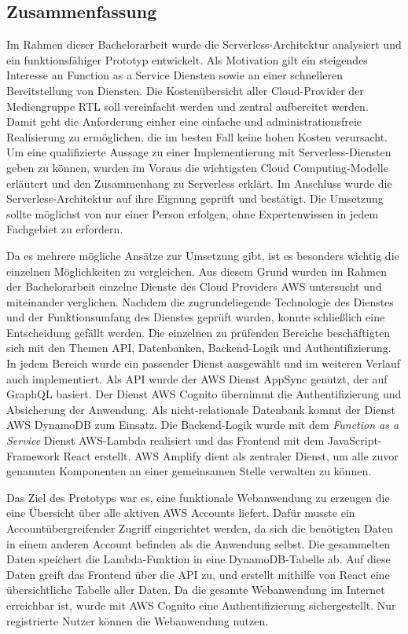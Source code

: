 \subsection{Zusammenfassung}
Im Rahmen dieser Bachelorarbeit wurde die Serverless-Architektur analysiert und ein funktionsfähiger Prototyp entwickelt.
Als Motivation gilt ein steigendes Interesse an Function as a Service Diensten sowie an einer schnelleren Bereitstellung von Diensten.
Die Kostenübersicht aller Cloud-Provider der Mediengruppe RTL soll vereinfacht werden und zentral aufbereitet werden.
Damit geht die Anforderung einher eine einfache und administrationsfreie Realisierung zu ermöglichen, die im besten Fall keine hohen Kosten verursacht.
Um eine qualifizierte Aussage zu einer Implementierung mit Serverless-Diensten geben zu können, wurden im Voraus die wichtigsten Cloud Computing-Modelle erläutert und den Zusammenhang zu Serverless erklärt.
Im Anschluss wurde die Serverless-Architektur auf ihre Eignung geprüft und bestätigt.
Die Umsetzung sollte möglichst von nur einer Person erfolgen, ohne Expertenwissen in jedem Fachgebiet zu erfordern.

Da es mehrere mögliche Ansätze zur Umsetzung gibt, ist es besonders wichtig die einzelnen Möglichkeiten zu vergleichen.
Aus diesem Grund wurden im Rahmen der Bachelorarbeit einzelne Dienste des Cloud Providers AWS untersucht und miteinander verglichen.
Nachdem die zugrundeliegende Technologie des Dienstes und der Funktionsumfang des Dienstes geprüft wurden, konnte schließlich eine Entscheidung gefällt werden.
Die einzelnen zu prüfenden Bereiche beschäftigten sich mit den Themen API, Datenbanken, Backend-Logik und Authentifizierung.
In jedem Bereich wurde ein passender Dienst ausgewählt und im weiteren Verlauf auch implementiert.
Als API wurde der AWS Dienst AppSync genutzt, der auf GraphQL basiert.
Der Dienst AWS Cognito übernimmt die Authentifizierung und Absicherung der Anwendung.
Als nicht-relationale Datenbank kommt der Dienst AWS DynamoDB zum Einsatz.
Die Backend-Logik wurde mit dem \textsl{Function as a Service} Dienst AWS-Lambda realisiert und das Frontend mit dem JavaScript-Framework React erstellt.
AWS Amplify dient als zentraler Dienst, um alle zuvor genannten Komponenten an einer gemeinsamen Stelle verwalten zu können.

Das Ziel des Prototyps war es, eine funktionale Webanwendung zu erzeugen die eine Übersicht über alle aktiven AWS Accounts liefert.
Dafür musste ein Accountübergreifender Zugriff eingerichtet werden, da sich die benötigten Daten in einem anderen Account befinden als die Anwendung selbst.
Die gesammelten Daten speichert die Lambda-Funktion in eine DynamoDB-Tabelle ab.
Auf diese Daten greift das Frontend über die API zu, und erstellt mithilfe von React eine übersichtliche Tabelle aller Daten.
Da die gesamte Webanwendung im Internet erreichbar ist, wurde mit AWS Cognito eine Authentifizierung sichergestellt.
Nur registrierte Nutzer können die Webanwendung nutzen.

